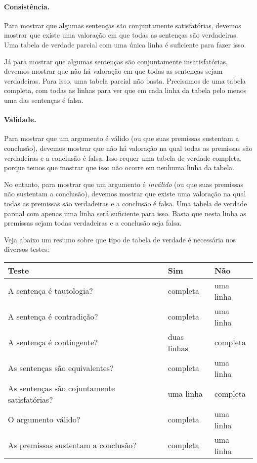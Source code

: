 \paragraph{Consistência.}
Para mostrar que algumas sentenças são conjuntamente satisfatórias, devemos mostrar que existe uma valoração em que todas as sentenças são verdadeiras.
Uma tabela de verdade parcial com uma única linha é suficiente para fazer isso.

Já para mostrar que algumas sentenças são conjuntamente insatisfatórias, devemos mostrar que não há valoração em que todas as sentenças sejam verdadeiras. 
Para isso, uma tabela parcial não basta. Precisamos de uma tabela completa, com todas as linhas para ver que em cada linha da tabela pelo menos uma das sentenças é falsa.

\paragraph{Validade.}
Para mostrar que um argumento é válido (ou que suas premissas sustentam a conclusão), devemos mostrar que não há valoração na qual todas as premissas são verdadeiras e a conclusão é falsa.
Isso requer uma tabela de verdade completa, porque temos que mostrar que isso não ocorre em nenhuma linha da tabela.

No entanto, para mostrar que um argumento é \emph{inválido} (ou que suas premissas não sustentam a conclusão), devemos mostrar que existe uma valoração na qual todas as premissas são verdadeiras e a conclusão é falsa.
Uma tabela de verdade parcial com apenas uma linha será suficiente para isso.
Basta que nesta linha as premissas sejam todas verdadeiras e a conclusão seja falsa.

Veja abaixo um resumo sobre que tipo de tabela de verdade é necessária nos diversos testes:
\begin{center}\label{t:TruthTable}
\begin{tabular}{l l l}
\cline{1-3}
\textbf{Teste} & \textbf{Sim} & \textbf{Não}\\
 \hline
\cline{1-3}
{\small A sentença é tautologia?} & {\small completa} & {\small uma linha} \\
{\small A sentença é  contradição?} &  {\small completa} & {\small uma linha} \\
{\small A sentença é contingente?} & {\small duas linhas} & {\small completa}\\
{\small As sentenças são equivalentes?} & {\small completa}  & {\small uma linha} \\
{\small As sentenças são cojuntamente satisfatórias?} & {\small uma linha} & {\small completa} \\
{\small O argumento válido?} & {\small completa} & {\small uma linha} \\
{\small As premissas sustentam a conclusão?} & {\small completa} & {\small uma linha}\\
\cline{1-3}
\end{tabular}
\end{center}
\label{table.CompleteVsPartial}


